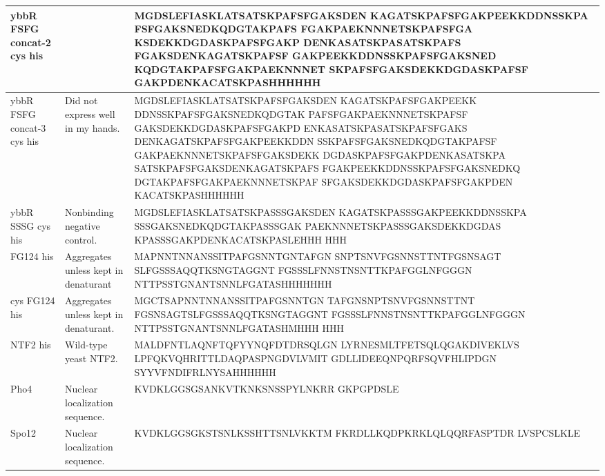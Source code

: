 \begin{center}
\begin{longtable}{p{3.5cm}p{4cm}p{8cm}}
ybbR FSFG concat-2 cys his& & MGDSLEFIASKLATSATSKPAFSFGAKSDEN
KAGATSKPAFSFGAKPEEKKDDNSSKPA
FSFGAKSNEDKQDGTAKPAFS
FGAKPAEKNNNETSKPAFSFGA
KSDEKKDGDASKPAFSFGAKP
DENKASATSKPASATSKPAFS
FGAKSDENKAGATSKPAFSF
GAKPEEKKDDNSSKPAFSFGAKSNED
KQDGTAKPAFSFGAKPAEKNNNET
SKPAFSFGAKSDEKKDGDASKPAFSF
GAKPDENKACATSKPASHHHHHH\\
      \hline
	ybbR FSFG concat-3 cys his& Did not express well in my hands.& MGDSLEFIASKLATSATSKPAFSFGAKSDEN
KAGATSKPAFSFGAKPEEKK
DDNSSKPAFSFGAKSNEDKQDGTAK
PAFSFGAKPAEKNNNETSKPAFSF
GAKSDEKKDGDASKPAFSFGAKPD
ENKASATSKPASATSKPAFSFGAKS
DENKAGATSKPAFSFGAKPEEKKDDN
SSKPAFSFGAKSNEDKQDGTAKPAFSF
GAKPAEKNNNETSKPAFSFGAKSDEKK
DGDASKPAFSFGAKPDENKASATSKPA
SATSKPAFSFGAKSDENKAGATSKPAFS
FGAKPEEKKDDNSSKPAFSFGAKSNEDKQ
DGTAKPAFSFGAKPAEKNNNETSKPAF
SFGAKSDEKKDGDASKPAFSFGAKPDEN
KACATSKPASHHHHHH\\
\hline
ybbR SSSG cys his & Nonbinding negative control. & MGDSLEFIASKLATSATSKPASSSGAKSDEN
KAGATSKPASSSGAKPEEKKDDNSSKPA
SSSGAKSNEDKQDGTAKPASSSGAK
PAEKNNNETSKPASSSGAKSDEKKDGDAS
KPASSSGAKPDENKACATSKPASLEHHH
HHH\\
	\hline

	FG124 his& Aggregates unless kept in denaturant & MAPNNTNNANSSITPAFGSNNTGNTAFGN
SNPTSNVFGSNNSTTNTFGSNSAGT
SLFGSSSAQQTKSNGTAGGNT
FGSSSLFNNSTNSNTTKPAFGGLNFGGGN
NTTPSSTGNANTSNNLFGATASHHHHHHH\\
\hline
	cys FG124 his& Aggregates unless kept in denaturant. & MGCTSAPNNTNNANSSITPAFGSNNTGN
TAFGNSNPTSNVFGSNNSTTNT
FGSNSAGTSLFGSSSAQQTKSNGTAGGNT
FGSSSLFNNSTNSNTTKPAFGGLNFGGGN
NTTPSSTGNANTSNNLFGATASHMHHH
HHH\\
\hline

NTF2 his & Wild-type yeast NTF2. & MALDFNTLAQNFTQFYYNQFDTDRSQLGN
LYRNESMLTFETSQLQGAKDIVEKLVS
LPFQKVQHRITTLDAQPASPNGDVLVMIT
GDLLIDEEQNPQRFSQVFHLIPDGN
SYYVFNDIFRLNYSAHHHHHH\\
	\hline
Pho4 & Nuclear localization sequence. & KVDKLGGSGSANKVTKNKSNSSPYLNKRR
GKPGPDSLE \\
\hline
Spo12 & Nuclear localization sequence. & KVDKLGGSGKSTSNLKSSHTTSNLVKKTM
FKRDLLKQDPKRKLQLQQRFASPTDR
LVSPCSLKLE
 \\

\end{longtable}
\end{center}

